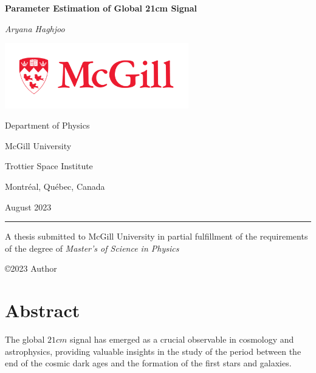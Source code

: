 \documentclass[12pt, TexShade, letterpaper]{report}
\author{\textcopyright Author, August, 2020}
\date{}
\renewcommand{\chaptermark}[1]{\markboth{#1}{}} %
\begin{document}
\begin{titlepage}
		\begin{center}
			\vspace*{0.5cm}

			\LARGE
			\textbf{Parameter Estimation of Global 21cm Signal}
			\vspace{1cm}
			
			\textit{Aryana Haghjoo}
			
			\vspace{1cm}
			
			\includegraphics[width=0.6\textwidth]{McGill_logo.png}
			
			\vspace{0.1cm}
			
			\Large
			Department of Physics
			
			\vspace{-6mm}
			McGill University
			
			\vspace{-6mm}
			Trottier Space Institute
			
			\vspace{-6mm}
			Montr\'eal, Qu\'ebec, Canada
			
			\vspace{5mm}
			August 2023
			\small
			\vspace{1cm}
			{\color{red} \hrule height 0.75mm}
			
			\vspace{0.2cm}
			
			A thesis submitted to McGill University in partial fulfillment of the requirements of the degree of
			\emph{Master's of Science in Physics}
		
			\copyright\hspace{0.5mm}2023 Author
			
		\end{center}
	\end{titlepage}
\setlength{\voffset}{2cm}
\renewcommand{\chaptermark}[1]{%
	\markboth{\thechapter.\ #1}{}}
\chapter*{Abstract}
	\label{chap:engAbstract}
The global $21cm$ signal has emerged as a crucial observable in cosmology and astrophysics, providing valuable insights in the study of the period between the end of the cosmic dark ages and the formation of the first stars and galaxies.\par
\end{document}
